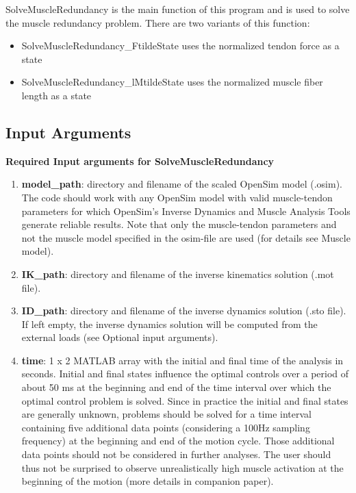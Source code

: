 \documentclass[a4paper,oneside,11pt]{article}
\begin{document}
SolveMuscleRedundancy is the main function of this program and is used to solve the muscle redundancy problem. There are two variants of this function:
\begin{itemize}
\item SolveMuscleRedundancy_FtildeState uses the normalized tendon force as a state
\item SolveMuscleRedundancy_lMtildeState uses the normalized muscle fiber length as a state
\end{itemize}


\subsection{Input Arguments}


\textbf{Required Input arguments for SolveMuscleRedundancy
}\begin{enumerate}
	\item \textbf{model_path}: directory and filename of the scaled OpenSim model (.osim). The code should work with any OpenSim model with valid muscle-tendon parameters for which OpenSim's Inverse Dynamics and Muscle Analysis Tools generate reliable results. Note that only the muscle-tendon parameters and not the muscle model specified in the osim-file are used (for details see Muscle model).
	\item \textbf{IK_path}: directory and filename of the inverse kinematics solution (.mot file).
	\item \textbf{ID_path}: directory and filename of the inverse dynamics solution  (.sto file). If left empty, the inverse dynamics solution will be computed from the external loads (see Optional input arguments).
	\item \textbf{time}: 1 x 2 MATLAB array with the initial and final time of the analysis in seconds. Initial and final states influence the optimal controls over a period of about 50 ms at the beginning and end of the time interval over which the optimal control problem is solved. Since in practice the initial and final states are generally unknown, problems should be solved for a time interval containing five additional data points (considering a 100Hz sampling frequency) at the beginning and end of the motion cycle. Those additional data points should not be considered in further analyses. The user should thus not be surprised to observe unrealistically high muscle activation at the beginning of the motion (more details in companion paper).
	

\end{enumerate}
\end{document}
